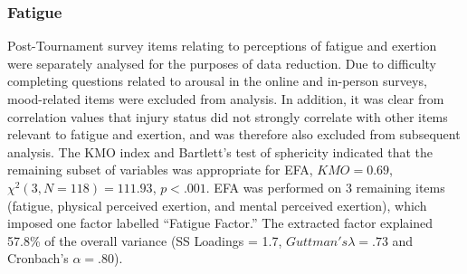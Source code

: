 \begin{CJK}{UTF8}{gbsn}






%    
%    

%    
%    
%    







\subsubsection{Fatigue \label{app8:fatigueEFA}}

Post-Tournament survey items relating to perceptions of fatigue and exertion were separately analysed for the purposes of data reduction.  Due to difficulty completing questions related to arousal in the online and in-person surveys, mood-related items were excluded from analysis.  In addition, it was clear from correlation values that injury status did not strongly correlate with other items relevant to fatigue and exertion, and was therefore also excluded from subsequent analysis.  The KMO index and Bartlett's test of sphericity indicated that the remaining subset of variables was appropriate for EFA, $KMO =  0.69$, $\chi^2(3, N = 118) = 111.93$, $p < .001$. EFA was performed on 3 remaining items (fatigue, physical perceived exertion, and mental perceived exertion), which imposed one factor labelled ``Fatigue Factor.''  The extracted factor explained 57.8\% of the overall variance (SS Loadings = 1.7, $Guttman's\lambda =.73$ and Cronbach's $\alpha = .80$).


\end{CJK}
